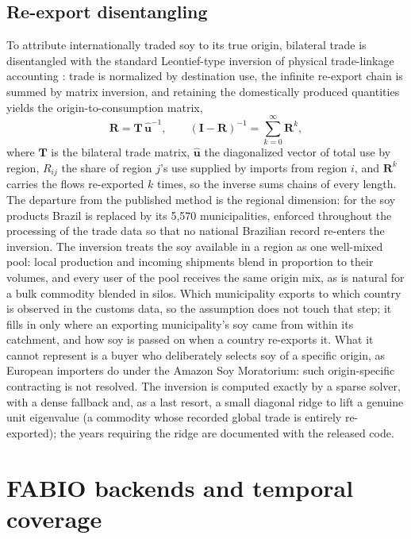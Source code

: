 \documentclass[pdflatex,sn-nature]{sn-jnl}%
\begin{document}
\subsection{Re-export disentangling}\label{subsubsec:reexport}
To attribute internationally traded soy to its true origin, bilateral
trade is disentangled with the standard Leontief-type inversion of
physical trade-linkage accounting \cite{kastner2011tracing}: trade is
normalized by destination use, the infinite re-export chain is summed
by matrix inversion, and retaining the domestically produced
quantities yields the origin-to-consumption matrix,
\begin{equation}\label{eq:reex}
  \mathbf{R}=\mathbf{T}\,\hat{\mathbf{u}}^{-1},
  \qquad
  (\mathbf{I}-\mathbf{R})^{-1}=\sum_{k=0}^{\infty}\mathbf{R}^{k},
\end{equation}
where $\mathbf{T}$ is the bilateral trade matrix, $\hat{\mathbf{u}}$
the diagonalized vector of total use by region, $R_{ij}$ the share of
region $j$'s use supplied by imports from region $i$, and
$\mathbf{R}^{k}$ carries the flows re-exported $k$ times, so the
inverse sums chains of every length. The departure from
the published method is the regional dimension: for the soy products
Brazil is replaced by its 5{,}570 municipalities, enforced throughout
the processing of the trade data so that no national Brazilian record
re-enters the inversion. The inversion treats the soy available in a
region as one well-mixed pool: local production and incoming shipments
blend in proportion to their volumes, and every user of the pool
receives the same origin mix, as is natural for a bulk commodity
blended in silos. Which municipality exports to which country is
observed in the customs data, so the assumption does not touch that
step; it fills in only where an exporting municipality's soy came from
within its catchment, and how soy is passed on when a country
re-exports it. What it cannot represent is a buyer who deliberately
selects soy of a specific origin, as European importers do under the
Amazon Soy Moratorium: such origin-specific contracting is not
resolved. The inversion is computed exactly by a sparse solver,
with a dense fallback and, as a last resort, a small diagonal ridge to
lift a genuine unit eigenvalue (a commodity whose recorded global
trade is entirely re-exported); the years requiring the ridge are
documented with the released code.

\section{FABIO backends and temporal coverage}\label{app:nesting}
\end{document}
